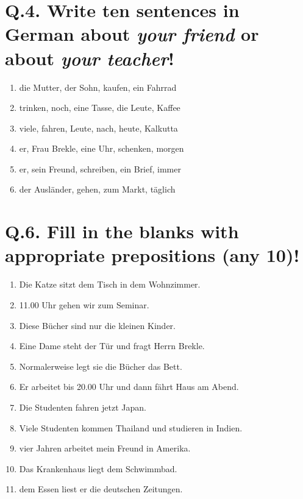 \documentclass[12pt,a4paper]{article}
\begin{document}
\section*{Q.4. Write ten sentences in German about \emph{your friend} or about \emph{your teacher}!}

\begin{enumerate}
    \item die Mutter, der Sohn, kaufen, ein Fahrrad
    \item trinken, noch, eine Tasse, die Leute, Kaffee
    \item viele, fahren, Leute, nach, heute, Kalkutta
    \item er, Frau Brekle, eine Uhr, schenken, morgen
    \item er, sein Freund, schreiben, ein Brief, immer
    \item der Ausländer, gehen, zum Markt, täglich
\end{enumerate}

\section*{Q.6. Fill in the blanks with appropriate prepositions (any 10)!}

\begin{enumerate}
    \item Die Katze sitzt \underline{\hspace{2cm}} dem Tisch in dem Wohnzimmer.
    \item \underline{\hspace{2cm}} 11.00 Uhr gehen wir zum Seminar.
    \item Diese Bücher sind nur \underline{\hspace{2cm}} die kleinen Kinder.
    \item Eine Dame steht \underline{\hspace{2cm}} der Tür und fragt Herrn Brekle.
    \item Normalerweise legt sie die Bücher \underline{\hspace{2cm}} das Bett.
    \item Er arbeitet bis 20.00 Uhr und dann fährt \underline{\hspace{2cm}} Haus am Abend.
    \item Die Studenten fahren jetzt \underline{\hspace{2cm}} Japan.
    \item Viele Studenten kommen \underline{\hspace{2cm}} Thailand und studieren in Indien.
    \item \underline{\hspace{2cm}} vier Jahren arbeitet mein Freund in Amerika.
    \item Das Krankenhaus liegt \underline{\hspace{2cm}} dem Schwimmbad.
    \item \underline{\hspace{2cm}} dem Essen liest er die deutschen Zeitungen.
\end{enumerate}
\end{document}
